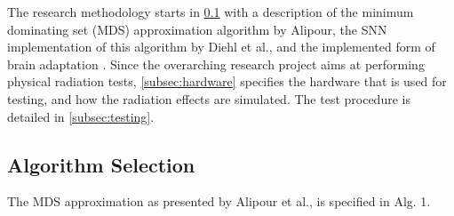 The research methodology starts in \cref{subsec:algorithm} with a description of the minimum dominating set (MDS) approximation algorithm by Alipour, the SNN implementation of this algorithm by Diehl et al., and the implemented form %
of brain adaptation \cite{alipour2020distributed}\cite{diehl}. Since the overarching research project aims at performing physical radiation tests, \cref{subsec:hardware} specifies the hardware that is used for testing, and how the radiation effects are simulated. The test procedure is detailed in \cref{subsec:testing}.

\subsection{Algorithm Selection}\label{subsec:algorithm}
The MDS approximation as presented by Alipour et al., is specified in Alg. 1.
